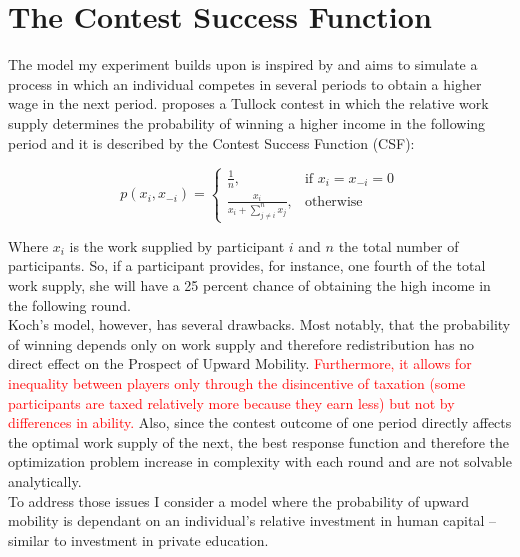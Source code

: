 \chapter{The Contest Success Function}
\label{ch:model}
\thispagestyle{fancy}

The model my experiment builds upon is inspired by \cite{koch2017} and aims to simulate a process in which an individual competes in several periods to obtain a higher wage in the next period. \cite{koch2017} proposes a Tullock contest in which the relative work supply determines the probability of winning a higher income in the following period and it is described by the Contest Success Function (CSF):

\begin{equation}
    p(x_i,x_{-i}) =
\begin{cases}
    \frac{1}{n},& \text{if } x_i = x_{-i} = 0\\
    \frac{x_i}{x_i + \sum_{j\neq i}^n x_{j}},              & \text{otherwise}
\end{cases}
\label{eq:csf}    
\end{equation}

\hfill \break

Where $x_i$ is the work supplied by participant $i$ and $n$ the total number of participants. So, if a participant provides, for instance, one fourth of the total work supply, she will have a 25 percent chance of obtaining the high income in the following round.\\

Koch's model, however, has several drawbacks. Most notably, that the probability of winning depends only on work supply and therefore redistribution has no direct effect on the Prospect of Upward Mobility. \textcolor{red}{Furthermore, it allows for inequality between players only through the disincentive of taxation (some participants are taxed relatively more because they earn less) but not by differences in ability.} Also, since the contest outcome of one period directly affects the optimal work supply of the next, the best response function and therefore the optimization problem increase in complexity with each round and are not solvable analytically.\\ 

To address those issues I consider a model where the probability of upward mobility is dependant on an individual's relative investment in human capital –similar to investment in private education.\\ 

